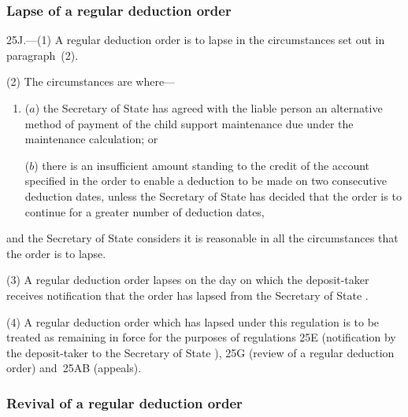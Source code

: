 \documentclass[12pt,a4paper]{article}
\begin{document}
\subsubsection[25J. Lapse of a regular deduction order]{Lapse of a regular deduction order}

25J.---(1)  A regular deduction order is to lapse in the circumstances set out in  paragraph~(2).

(2) The circumstances are where—
\begin{enumerate}\item[]
($a$) the 
Secretary of State  %
has agreed with the liable person an alternative method of payment of the child support maintenance due under the maintenance calculation; or

($b$) there is an insufficient amount standing to the credit of the account specified in the order to enable a deduction to be made on two consecutive deduction dates, unless the 
Secretary of State  %
has decided that the order is to continue for a greater number of deduction dates,
\end{enumerate}
and the 
Secretary of State  %
considers it is reasonable in all the circumstances that the order is to lapse.

(3) A regular deduction order lapses on the day on which the deposit-taker receives notification that the order has lapsed from the 
Secretary of State%
.

(4) A regular deduction order which has lapsed under this regulation is to be treated as remaining in force for the purposes of regulations 25E (notification by the deposit-taker to the 
Secretary of State%
), 25G (review of a regular deduction order) and~25AB (appeals).


\subsubsection[25K. Revival of a regular deduction order]{Revival of a regular deduction order}
\end{document}
